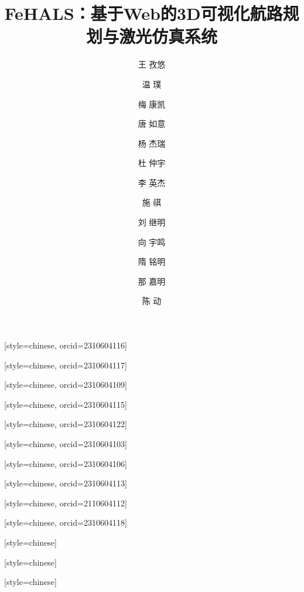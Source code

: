 \documentclass[a4paper,fleqn]{cas-sc}
\begin{document}
\let\WriteBookmarks\relax
\def\floatpagepagefraction{1}
\def\textpagefraction{.001}

\shorttitle{}
\title [mode = title]{FeHALS：基于Web的3D可视化航路规划与激光仿真系统}




\author[1]{王 孜悠}[style=chinese, orcid=2310604116]

\author[1]{温 璞}[style=chinese, orcid=2310604117]

\author[1]{梅 康凯}[style=chinese, orcid=2310604109]

\author[1]{唐 如意}[style=chinese, orcid=2310604115]

\author[1]{杨 杰瑞}[style=chinese, orcid=2310604122]

\author[1]{杜 仲宇}[style=chinese, orcid=2310604103]

\author[1]{李 英杰}[style=chinese, orcid=2310604106]

\author[1]{施 祺}[style=chinese, orcid=2310604113]

\author[1]{刘 继明}[style=chinese, orcid=2110604112]

\author[1]{向 宇鸣}[style=chinese, orcid=2310604118]

\author[1]{隋 铭明}[style=chinese]
\fnmark[1]

\author[1]{那 嘉明}[style=chinese]
\fnmark[1]

\author[1]{陈 动}[style=chinese]
\fnmark[1]
\end{document}
